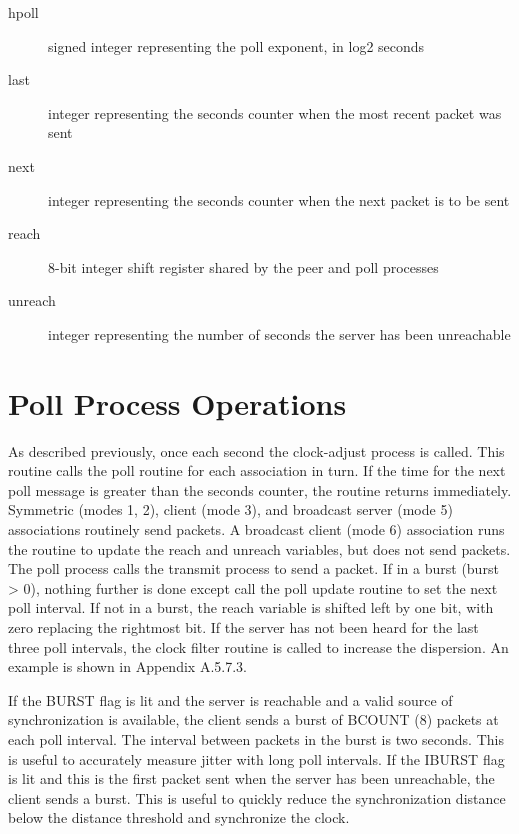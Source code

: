 \begin{description}

  \item[hpoll] signed integer representing the poll exponent, in log2 seconds

  \item[last] integer representing the seconds counter when the most recent
    packet was sent

  \item[next] integer representing the seconds counter when the next packet
    is to be sent

  \item[reach] 8-bit integer shift register shared by the peer and poll
    processes

  \item[unreach] integer representing the number of seconds the server has
    been unreachable

\end{description}

\section{Poll Process Operations}

As described previously, once each second the clock-adjust process is
called.  This routine calls the poll routine for each association in
turn.  If the time for the next poll message is greater than the
seconds counter, the routine returns immediately.  Symmetric (modes
1, 2), client (mode 3), and broadcast server (mode 5) associations
routinely send packets.  A broadcast client (mode 6) association runs
the routine to update the reach and unreach variables, but does not
send packets.  The poll process calls the transmit process to send a
packet.  If in a burst (burst > 0), nothing further is done except
call the poll update routine to set the next poll interval.
  If not in a burst, the reach variable is shifted left by one bit,
with zero replacing the rightmost bit.  If the server has not been
heard for the last three poll intervals, the clock filter routine is
called to increase the dispersion.  An example is shown in
Appendix A.5.7.3.

If the BURST flag is lit and the server is reachable and a valid
source of synchronization is available, the client sends a burst of
BCOUNT (8) packets at each poll interval.  The interval between
packets in the burst is two seconds.  This is useful to accurately
measure jitter with long poll intervals.  If the IBURST flag is lit
and this is the first packet sent when the server has been
unreachable, the client sends a burst.  This is useful to quickly
reduce the synchronization distance below the distance threshold and
synchronize the clock.


